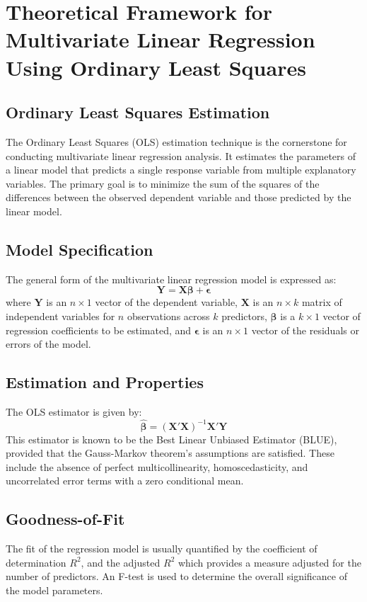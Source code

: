 \documentclass{aip-cp}
\begin{document}
\section{Theoretical Framework for Multivariate Linear Regression Using Ordinary Least Squares}

\subsection{Ordinary Least Squares Estimation}
The Ordinary Least Squares (OLS) estimation technique is the cornerstone for conducting multivariate linear regression analysis. It estimates the parameters of a linear model that predicts a single response variable from multiple explanatory variables. The primary goal is to minimize the sum of the squares of the differences between the observed dependent variable and those predicted by the linear model.

\subsection{Model Specification}
The general form of the multivariate linear regression model is expressed as:
\begin{equation}
    \mathbf{Y} = \mathbf{X\beta} + \boldsymbol{\epsilon}
\end{equation}
where $\mathbf{Y}$ is an $n \times 1$ vector of the dependent variable, $\mathbf{X}$ is an $n \times k$ matrix of independent variables for $n$ observations across $k$ predictors, $\boldsymbol{\beta}$ is a $k \times 1$ vector of regression coefficients to be estimated, and $\boldsymbol{\epsilon}$ is an $n \times 1$ vector of the residuals or errors of the model.

\subsection{Estimation and Properties}
The OLS estimator is given by:
\begin{equation}
    \hat{\boldsymbol{\beta}} = (\mathbf{X'X})^{-1}\mathbf{X'Y}
\end{equation}
This estimator is known to be the Best Linear Unbiased Estimator (BLUE), provided that the Gauss-Markov theorem's assumptions are satisfied. These include the absence of perfect multicollinearity, homoscedasticity, and uncorrelated error terms with a zero conditional mean.

\subsection{Goodness-of-Fit}
The fit of the regression model is usually quantified by the coefficient of determination $R^2$, and the adjusted $R^2$ which provides a measure adjusted for the number of predictors. An F-test is used to determine the overall significance of the model parameters.
\end{document}
